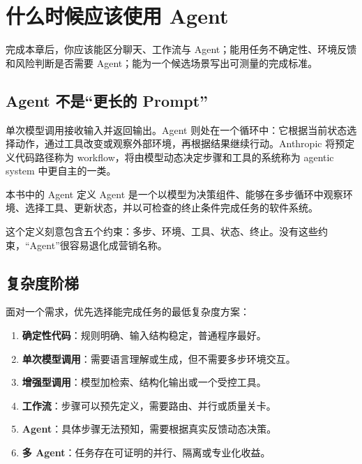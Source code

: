 \chapter{什么时候应该使用 Agent}

\begin{takeaway}[学习目标]
完成本章后，你应该能区分聊天、工作流与 Agent；能用任务不确定性、环境反馈和风险判断是否需要 Agent；能为一个候选场景写出可测量的完成标准。
\end{takeaway}

\section{Agent 不是“更长的 Prompt”}

单次模型调用接收输入并返回输出。Agent 则处在一个循环中：它根据当前状态选择动作，通过工具改变或观察外部环境，再根据结果继续行动。Anthropic 将预定义代码路径称为 workflow，将由模型动态决定步骤和工具的系统称为 agentic system 中更自主的一类\citep{anthropic_effective_agents}。

\begin{definitionbox}{本书中的 Agent 定义}
Agent 是一个以模型为决策组件、能够在多步循环中观察环境、选择工具、更新状态，并以可检查的终止条件完成任务的软件系统。
\end{definitionbox}

这个定义刻意包含五个约束：多步、环境、工具、状态、终止。没有这些约束，“Agent”很容易退化成营销名称。

\section{复杂度阶梯}

面对一个需求，优先选择能完成任务的最低复杂度方案：

\begin{enumerate}
  \item \textbf{确定性代码}：规则明确、输入结构稳定，普通程序最好。
  \item \textbf{单次模型调用}：需要语言理解或生成，但不需要多步环境交互。
  \item \textbf{增强型调用}：模型加检索、结构化输出或一个受控工具。
  \item \textbf{工作流}：步骤可以预先定义，需要路由、并行或质量关卡。
  \item \textbf{Agent}：具体步骤无法预知，需要根据真实反馈动态决策。
  \item \textbf{多 Agent}：任务存在可证明的并行、隔离或专业化收益。
\end{enumerate}

